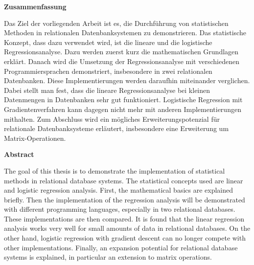 

\clearemptydoublepage
{}
{}





\vspace*{1cm}
\begin{center}
{\Large \bf Zusammenfassung}
\end{center}
\vspace{1cm}

Das Ziel der vorliegenden Arbeit ist es, die Durchführung von statistischen Methoden in relationalen Datenbanksystemen zu demonstrieren. Das statistische Konzept, dass dazu verwendet wird, ist die lineare und die logistische Regressionsanalyse. Dazu werden zuerst kurz die mathematischen Grundlagen erklärt. Danach wird die Umsetzung der Regressionsanalyse mit verschiedenen Programmiersprachen demonstriert, insbesondere in zwei relationalen Datenbanken. Diese Implementierungen werden daraufhin miteinander verglichen. Dabei stellt man fest, dass die lineare Regressionsanalyse bei kleinen Datenmengen in Datenbanken sehr gut funktioniert. Logistische Regression mit Gradientenverfahren kann dagegen nicht mehr mit anderen Implementierungen mithalten. Zum Abschluss wird ein mögliches Erweiterungspotenzial für relationale Datenbanksysteme erläutert, insbesondere eine Erweiterung um Matrix-Operationen.

\vspace*{2cm}
\begin{center}
{\Large \bf Abstract}
\end{center}
\vspace{1cm}

The goal of this thesis is to demonstrate the implementation of statistical methods in relational database systems. The statistical concepts used are linear and logistic regression analysis. First, the mathematical basics are explained briefly. Then the implementation of the regression analysis will be demonstrated with different programming languages, especially in two relational databases. These implementations are then compared. It is found that the linear regression analysis works very well for small amounts of data in relational databases. On the other hand, logistic regression with gradient descent can no longer compete with other implementations. Finally, an expansion potential for relational database systems is explained, in particular an extension to matrix operations.
